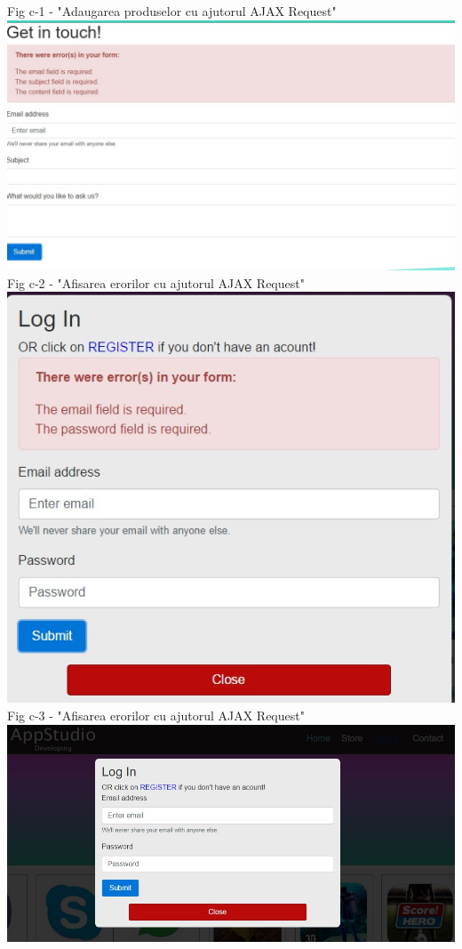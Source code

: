 \begin{center}
Fig c-1 - "Adaugarea produselor cu ajutorul AJAX Request" \\
\vspace{10 mm}
\includegraphics[scale=0.55]{contacterror} \\
Fig c-2 - "Afisarea erorilor cu ajutorul AJAX Request" \\
\vspace{10 mm}
\includegraphics[scale=0.55]{errorlogin} \\
Fig c-3 - "Afisarea erorilor cu ajutorul AJAX Request" \\
\vspace{10 mm}
\includegraphics[scale=0.55]{signin} \\

\end{center}
